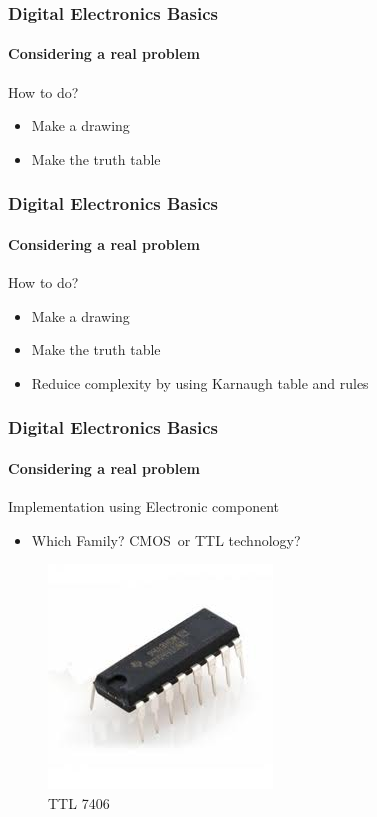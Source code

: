 \documentclass{beamer}
\begin{document}
\begin{frame}
  \frametitle{Digital Electronics Basics}
  \framesubtitle{Considering a real problem}
  \begin{block}{How to do?}
	  \begin{itemize}
		  \item Make a drawing
		\item Make the truth table
	  \end{itemize}
\end{block}
\end{frame}

\begin{frame}
  \frametitle{Digital Electronics Basics}
  \framesubtitle{Considering a real problem}
  \begin{block}{How to do?}
	  \begin{itemize}
		  \item Make a drawing
		\item Make the truth table
		\item Reduice complexity by using Karnaugh table and rules
	  \end{itemize}
\end{block}
\end{frame}


\begin{frame}
  \frametitle{Digital Electronics Basics}
  \framesubtitle{Considering a real problem}
  \begin{block}{Implementation using Electronic component}
    \begin{itemize}
	\item Which Family? CMOS or TTL technology?
    \end{itemize}
  \end{block}

    \begin{figure}
      \centering
      \includegraphics[width=.2\textwidth]{./images/ttl_7406.png}
      \caption{TTL 7406}
    \end{figure}
\end{frame}
\end{document}
